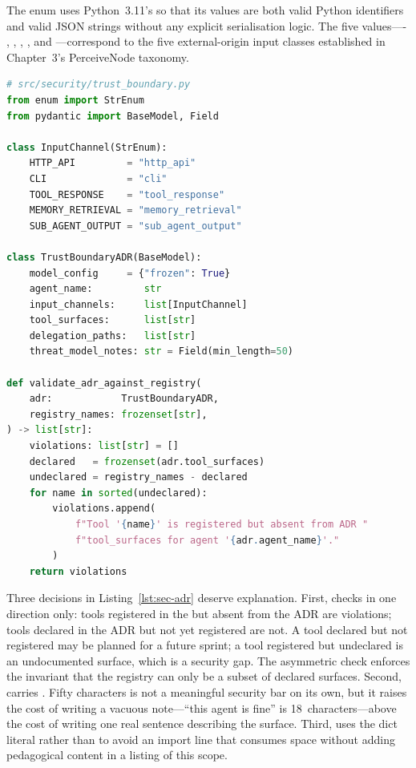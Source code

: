 The  enum uses Python~3.11's  so that
its values are both valid Python identifiers and valid JSON strings
without any explicit serialisation logic. The five values----%
, , ,
, and ---correspond to
the five external-origin input classes established in
Chapter~3's PerceiveNode taxonomy.

\begin{lstlisting}[language=Python,
  caption={TrustBoundaryADR and validate\_adr\_against\_registry},
  label={lst:sec-adr}]
# src/security/trust_boundary.py
from enum import StrEnum
from pydantic import BaseModel, Field

class InputChannel(StrEnum):
    HTTP_API         = "http_api"
    CLI              = "cli"
    TOOL_RESPONSE    = "tool_response"
    MEMORY_RETRIEVAL = "memory_retrieval"
    SUB_AGENT_OUTPUT = "sub_agent_output"

class TrustBoundaryADR(BaseModel):
    model_config     = {"frozen": True}
    agent_name:         str
    input_channels:     list[InputChannel]
    tool_surfaces:      list[str]
    delegation_paths:   list[str]
    threat_model_notes: str = Field(min_length=50)

def validate_adr_against_registry(
    adr:            TrustBoundaryADR,
    registry_names: frozenset[str],
) -> list[str]:
    violations: list[str] = []
    declared   = frozenset(adr.tool_surfaces)
    undeclared = registry_names - declared
    for name in sorted(undeclared):
        violations.append(
            f"Tool '{name}' is registered but absent from ADR "
            f"tool_surfaces for agent '{adr.agent_name}'."
        )
    return violations
\end{lstlisting}

Three decisions in Listing~\ref{lst:sec-adr} deserve explanation.
First,  checks in one direction
only: tools registered in the  but absent from the
ADR are violations; tools declared in the ADR but not yet registered
are not. A tool declared but not registered may be planned for a future
sprint; a tool registered but undeclared is an undocumented surface,
which is a security gap. The asymmetric check enforces the invariant
that the registry can only be a subset of declared surfaces. Second,
 carries .
Fifty characters is not a meaningful security bar on its own, but it
raises the cost of writing a vacuous note---``this agent is fine'' is
18~characters---above the cost of writing one real sentence describing
the surface. Third,  uses the
dict literal rather than  to avoid an import line that
consumes space without adding pedagogical content in a listing of this
scope.

